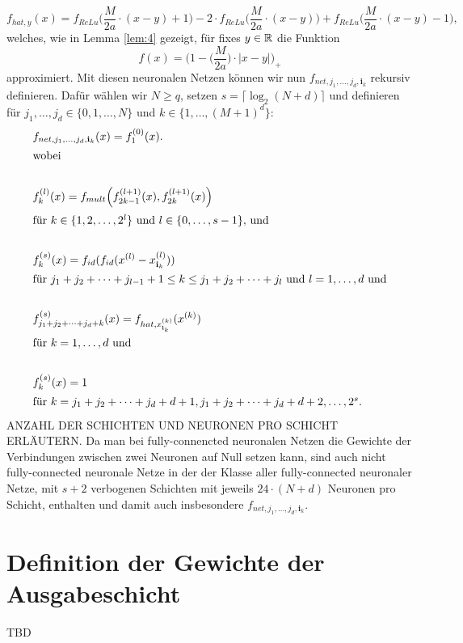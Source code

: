 \begin{equation}
\label{def:fhat}
f_{hat,y}(x) = f_{ReLu}\bigg(\frac{M}{2a} \cdot (x - y) + 1\bigg) - 2 \cdot f_{ReLu}\bigg(\frac{M}{2a} \cdot (x - y)\bigg) +  f_{ReLu}\bigg(\frac{M}{2a} \cdot (x - y) - 1\bigg),
\end{equation}
welches, wie in Lemma \ref{lem:4} gezeigt, für fixes $y \in \mathbb{R}$ die Funktion $$f(x) = \bigg(1 - \bigg(\frac{M}{2a}\bigg) \cdot |x - y|\bigg)_+$$ approximiert. 
Mit diesen neuronalen Netzen können wir nun $f_{net,j_1,\dots,j_d,\mathbf{i}_k}$ rekursiv definieren. Dafür wählen wir $N \geq q$, setzen $s = \lceil\log_2(N + d)\rceil$ und definieren für $j_1,\dots,j_d \in \{0, 1,\dots, N\}$ und $k \in \{1,\dots,(M + 1)^d\}\colon$  
\begin{align*}
\label{fnet}
& f_{net,j_1,\dots,j_d,\mathbf{i}_k}(x) = f_1^{(0)}(x). \\
\intertext{wobei} \\
& f_k^{(l)}(x) = f_{mult}\Big(f_{2k - 1}^{(l + 1)}(x),f_{2k}^{(l + 1)}(x)\Big) \\
\intertext{für $k \in \{1, 2, \dots, 2^l \}$ und $l \in\{0,\dots,s - 1\}, $ und} \\
& f_k^{(s)}(x) = f_{id}(f_{id}(x^{(l)} - x_{\mathbf{i}_k}^{(l)}))  \\
\intertext{für $j_1 + j_2 + \dots + j_{l-1} + 1 \leq k \leq j_1 + j_2 + \dots + j_l$ und $l = 1,\dots,d$ und} \\ 
& f_{j_1 + j_2 + \dots + j_d + k}^{(s)}(x) = f_{hat,x_{\mathbf{i}_k}^{(k)}}(x^{(k)}) \\
\intertext{für $k = 1,\dots,d$ und} \\
& f_k^{(s)}(x) = 1 \\
\intertext{für $k = j_1 + j_2 + \dots + j_d + d + 1,j_1 + j_2 + \dots + j_d + d + 2,\dots,2^s.$}
\end{align*} 
ANZAHL DER SCHICHTEN UND NEURONEN PRO SCHICHT ERLÄUTERN.
Da man bei fully-connencted neuronalen Netzen die Gewichte der Verbindungen zwischen zwei Neuronen auf Null setzen kann, sind auch nicht fully-connected neuronale Netze in der der Klasse aller fully-connected neuronaler Netze, mit $s + 2$ verbogenen Schichten mit jeweils $24 \cdot (N + d)$ Neuronen pro Schicht, enthalten und damit auch insbesondere $f_{net,j_1,\dots,j_d,\mathbf{i}_k}$.


\section{Definition der Gewichte der Ausgabeschicht}

TBD